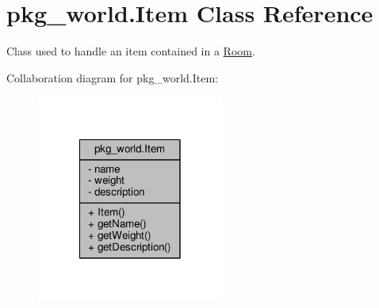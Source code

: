 \hypertarget{classpkg__world_1_1Item}{\section{pkg\-\_\-world.\-Item Class Reference}
\label{classpkg__world_1_1Item}
}


Class used to handle an item contained in a \hyperlink{classpkg__world_1_1Room}{Room}.  




Collaboration diagram for pkg\-\_\-world.\-Item\-:\nopagebreak
\begin{figure}[H]
\begin{center}
\leavevmode
\includegraphics[width=174pt]{classpkg__world_1_1Item__coll__graph}
\end{center}
\end{figure}
